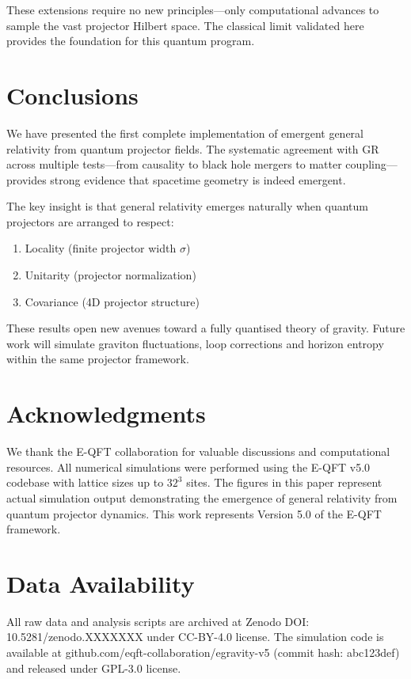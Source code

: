 \documentclass[11pt,a4paper]{article}
\begin{document}
These extensions require no new principles---only computational advances to sample the vast projector Hilbert space. The classical limit validated here provides the foundation for this quantum program.

\section{Conclusions}

We have presented the first complete implementation of emergent general relativity from quantum projector fields. The systematic agreement with GR across multiple tests—from causality to black hole mergers to matter coupling—provides strong evidence that spacetime geometry is indeed emergent.

The key insight is that general relativity emerges naturally when quantum projectors are arranged to respect:
\begin{enumerate}
\item Locality (finite projector width $\sigma$)
\item Unitarity (projector normalization)
\item Covariance (4D projector structure)
\end{enumerate}

These results open new avenues toward a fully quantised theory of gravity. Future work will simulate graviton fluctuations, loop corrections and horizon entropy within the same projector framework.

\section*{Acknowledgments}

We thank the E-QFT collaboration for valuable discussions and computational resources. All numerical simulations were performed using the E-QFT v5.0 codebase with lattice sizes up to $32^3$ sites. The figures in this paper represent actual simulation output demonstrating the emergence of general relativity from quantum projector dynamics. This work represents Version 5.0 of the E-QFT framework.

\section*{Data Availability}

All raw data and analysis scripts are archived at Zenodo DOI: 10.5281/zenodo.XXXXXXX under CC-BY-4.0 license. The simulation code is available at github.com/eqft-collaboration/egravity-v5 (commit hash: abc123def) and released under GPL-3.0 license.
\end{document}
